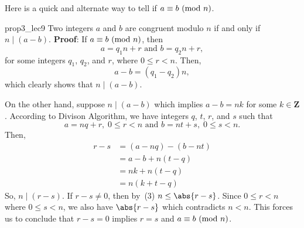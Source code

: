 Here is a quick and alternate way to tell if $ a\equiv b\ (\mathrm{mod}\ n) $.
\begin{Proposition}{}{prop3_lec9}
    Two integers $ a $ and $ b $ are congruent modulo $ n $ if and only if $ n\mid(a-b) $.
    \tcblower{}
    \textbf{Proof}: If $ a\equiv b\ (\mathrm{mod}\ n) $, then
    \[  a=q_{1} n+r \text { and } b=q_{2} n+r, \]
    for some integers $ q_1 $, $ q_2 $, and $ r $, where $0 \leq r<n$. Then,
    \[ a-b=(q_{1}-q_{2}) n, \]
    which clearly shows that $n \mid (a-b)$.

    On the other hand, suppose $n \mid (a-b)$ which implies $a-b=n k$ for some $k \in \mathbf{Z}$.
    According to Divison Algorithm, we have integers $q$, $ t $, $ r $, and $ s $ such that
    \[ a=n q+r,\; 0 \leq r<n \text { and } b=n t+s,\; 0 \leq s<n. \]
    Then,
    \begin{align*}
        r-s & =(a-n q)-(b-n t) \\
            & =a-b+n(t-q)      \\
            & =n k+n(t-q)      \\
            & =n(k+t-q)
    \end{align*}
    So, $n \mid (r-s)$. If $r-s \neq 0$, then by~(3) $ n \leq\abs{r-s} $. Since $0 \leq r<n$ where $0 \leq s<n$,
    we also have $\abs{r-s}$ which contradicts $n<n$. This forces us to conclude that $r-s=0$ implies $r=s$ and $a \equiv b\ (\mathrm{mod}\ n) $.
\end{Proposition}